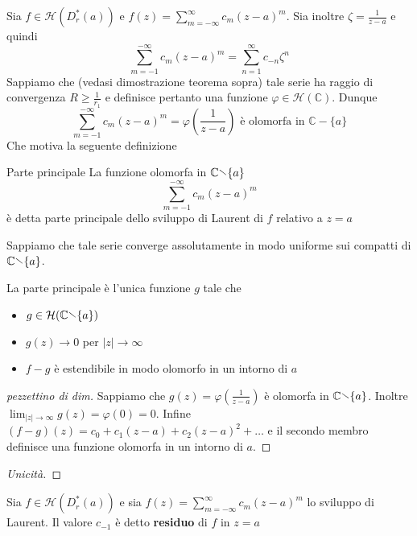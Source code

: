Sia \(f \in \mathcal{H}{(D^{*}_{r} {(a)})}\) e \(f{(z)} =
\sum_{m=-\infty}^{\infty} c_{m} {(z-a)}^{m} \). Sia inoltre \(\zeta =
\frac{1}{z-a}\) e quindi
\[
    \sum_{m=-1}^{-\infty} c_{m} {(z-a)}^{m} = \sum_{n=1}^{\infty} c_{-n}
    \zeta^{n}
\]
Sappiamo che (vedasi dimostrazione teorema sopra) tale serie ha raggio di
convergenza \(R \ge  \frac{1}{r_{1}}\) e definisce pertanto una funzione
\(\varphi \in \mathcal{H}{(\mathbb{C})}\). Dunque
\[
    \sum_{m=-1}^{-\infty} c_{m} {(z-a)}^{m} = \varphi {\left( \frac{1}{z-a}
    \right)} \text{ è olomorfa in \(\mathbb{C} - \{a\}\)} 
\]
Che motiva la seguente definizione
\begin{definition}{Parte principale}
    La funzione olomorfa in \(\mathbb{C} \sminus  \{a\} \) 
\[
    \sum_{m=-1}^{-\infty} c_{m} {(z-a)}^{m} 
\]
    è detta parte principale dello sviluppo di Laurent di \(f\) relativo a \(z=a\) 
\end{definition}
Sappiamo che tale serie converge assolutamente in modo uniforme sui compatti di
\(\mathbb{C} \sminus \{a\} \). 

\begin{proposition}
    La parte principale è l'unica funzione \(g\) tale che
\begin{itemize}
    \item \(g \in \mathcal{H}{(\mathbb{C} \sminus \{a\} )}\) 
    \item \(g{(z)} \to 0\) per \(|z| \to \infty\) 
    \item \(f-g\) è estendibile in modo olomorfo in un intorno di \(a\) 
\end{itemize}
\end{proposition}
\begin{proof}[pezzettino di dim]
    Sappiamo che \(g{(z)} = \varphi {\left( \frac{1}{z-a} \right)} \) è olomorfa
    in \(\mathbb{C} \sminus \{a\} \). Inoltre \(\lim_{|z|\to \infty} g{(z)} =
    \varphi {(0)} = 0\). Infine \((f-g){(z)} = c_{0}+c_{1}{(z-a)} +
    c_{2}{(z-a)}^2 + \dots\) e il secondo membro definisce una funzione olomorfa
    in un intorno di \(a\).
\end{proof}
\begin{proof}[Unicità]
\end{proof}
\begin{definition}[Residuo]
    Sia \(f \in \mathcal{H}{(D^{*}_r{(a)})}\) e sia \(f{(z)} =
    \sum_{m=-\infty}^{\infty} c_{m} {(z-a)}^{m}\) lo sviluppo di Laurent. Il
    valore \(c_{-1} \) è detto \textbf{residuo} di \(f\)  in \(z=a\) 
\end{definition}

